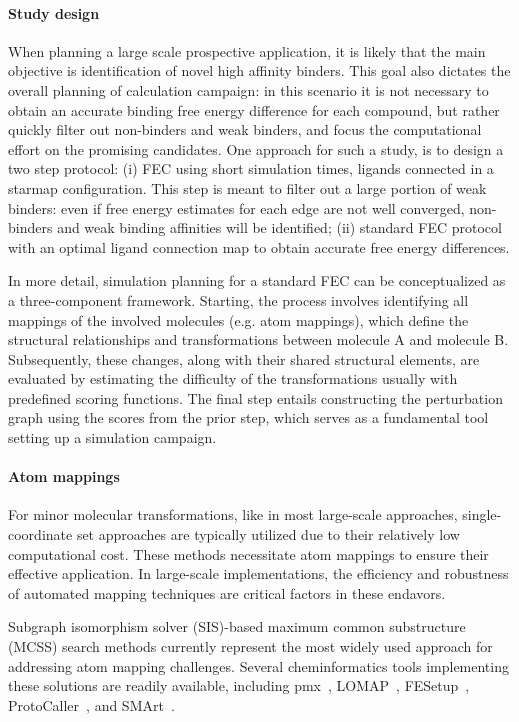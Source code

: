 \documentclass[9pt,bestpractices,pubversion]{livecoms}
\begin{document}
\paragraph{Study design}
When planning a large scale prospective application, it is likely that the main objective is identification of novel high affinity binders. This goal also dictates the overall planning of calculation campaign: in this scenario it is not necessary to obtain an accurate binding free energy difference for each compound, but rather quickly filter out non-binders and weak binders, and focus the computational effort on the promising candidates. One approach for such a study, is to design a two step protocol: (i) FEC using short simulation times, ligands connected in a starmap configuration. This step is meant to filter out a large portion of weak binders: even if free energy estimates for each edge are not well converged, non-binders and weak binding affinities will be identified; (ii) standard FEC protocol with an optimal ligand connection map to obtain accurate free energy differences.

In more detail, simulation planning for a standard FEC can be conceptualized as a three-component framework. Starting, the process involves identifying all mappings of the involved molecules (e.g. atom mappings), which define the structural relationships and transformations between molecule A and molecule B. Subsequently, these changes, along with their shared structural elements, are evaluated by estimating the difficulty of the transformations usually with predefined scoring functions. The final step entails constructing the perturbation graph using the scores from the prior step, which serves as a fundamental tool setting up a simulation campaign.

\paragraph{Atom mappings}
For minor molecular transformations, like in most large-scale approaches, single-coordinate set approaches are typically utilized due to their relatively low computational cost. These methods necessitate atom mappings to ensure their effective application. In large-scale implementations, the efficiency and robustness of automated mapping techniques are critical factors in these endavors.

Subgraph isomorphism solver (SIS)-based maximum common substructure (MCSS) search methods currently represent the most widely used approach for addressing atom mapping challenges. Several cheminformatics tools implementing these solutions are readily available, including pmx~\cite{gapsys2015pmx}, LOMAP~\cite{liu2013lead}, FESetup~\cite{loeffler2015fesetup}, ProtoCaller~\cite{suruzhon2020protocaller}, and SMArt~\cite{petrov2021perturbation}.
\end{document}
